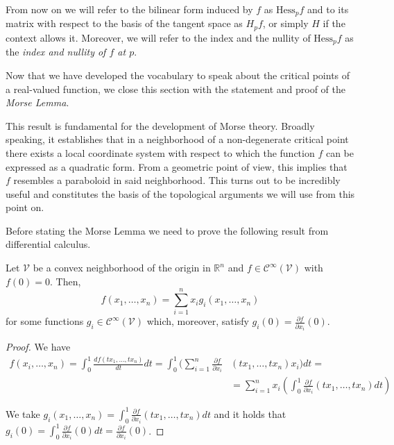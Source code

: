 \begin{nota}
    From now on we will refer to the bilinear form induced by $f$ as $\text{Hess}_pf$ and to its matrix with respect to the basis of the tangent space as $H_pf$, or simply $H$ if the context allows it. Moreover, we will refer to the index and the nullity of $\text{Hess}_pf$ as the \textit{index and nullity of $f$ at $p$}.
\end{nota}
\bigskip


Now that we have developed the vocabulary to speak about the critical points of a real-valued function, we close this section with the statement and proof of the \textit{Morse Lemma}.

This result is fundamental for the development of Morse theory. Broadly speaking, it establishes that in a neighborhood of a non-degenerate critical point there exists a local coordinate system with respect to which the function $f$ can be expressed as a quadratic form. From a geometric point of view, this implies that $f$ resembles a paraboloid in said neighborhood. This turns out to be incredibly useful and constitutes the basis of the topological arguments we will use from this point on.

\bigskip

Before stating the Morse Lemma we need to prove the following result from differential calculus.

\begin{lemma}
    Let $\mathcal{V}$ be a convex neighborhood of the origin in $\mathbb{R}^n$ and $f\in \mathcal{C}^\infty(\mathcal{V})$ with $f(0)=0$. Then,
    \begin{equation*}
        f(x_1,\dots,x_n)=\sum_{i=1}^n x_ig_i(x_1,\dots,x_n)
    \end{equation*}
    for some functions $g_i\in \mathcal{C}^\infty(\mathcal{V})$ which, moreover, satisfy $g_i(0)=\frac{\partial f}{\partial x_i}(0)$.
\end{lemma}
\begin{proof}
    We have
\begin{align*}
    f(x_i,\dots,x_n)=\int_0^1 \frac{df(tx_1,\dots,tx_n)}{dt}dt = \int_0^1 \big(\sum_{i=1}^n \frac{\partial f}{\partial x_i}&(tx_1,\dots,tx_n)x_i \big)dt =\\
    &=\sum_{i=1}^n x_i \left(\int_0^1 \frac{\partial f}{\partial x_i}(tx_1,\dots,tx_n )dt\right)
\end{align*}

We take $g_i(x_1,\dots,x_n) = \int_0^1 \frac{\partial f}{\partial x_i}(tx_1,\dots,tx_n )dt$ and it holds that $g_i(0)=\int_0^1 \frac{\partial f}{\partial x_i}(0)dt =\frac{\partial f}{\partial x_i}(0)$.

\end{proof}
\bigskip

